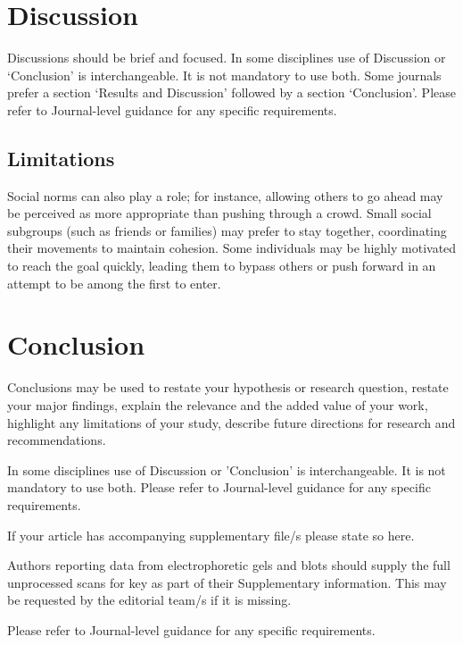 \documentclass[pdflatex,sn-mathphys-num]{sn-jnl}%
\theoremstyle{thmstyleone}%
\theoremstyle{thmstyletwo}%
\theoremstyle{thmstylethree}%
\begin{document}
\section{Discussion}
\label{sec:discussion}

Discussions should be brief and focused. In some disciplines use of Discussion or `Conclusion' is interchangeable. It is not mandatory to use both. Some journals prefer a section `Results and Discussion' followed by a section `Conclusion'. Please refer to Journal-level guidance for any specific requirements. 

\subsection{Limitations}
Social norms can also play a role; for instance, allowing others to go ahead may be perceived as more appropriate than pushing through a crowd. Small social subgroups (such as friends or families) may prefer to stay together, coordinating their movements to maintain cohesion. Some individuals may be highly motivated to reach the goal quickly, leading them to bypass others or push forward in an attempt to be among the first to enter. 

\section{Conclusion}\label{sec13}

Conclusions may be used to restate your hypothesis or research question, restate your major findings, explain the relevance and the added value of your work, highlight any limitations of your study, describe future directions for research and recommendations. 

In some disciplines use of Discussion or 'Conclusion' is interchangeable. It is not mandatory to use both. Please refer to Journal-level guidance for any specific requirements. 

\backmatter


If your article has accompanying supplementary file/s please state so here. 

Authors reporting data from electrophoretic gels and blots should supply the full unprocessed scans for key as part of their Supplementary information. This may be requested by the editorial team/s if it is missing.

Please refer to Journal-level guidance for any specific requirements.
\end{document}
